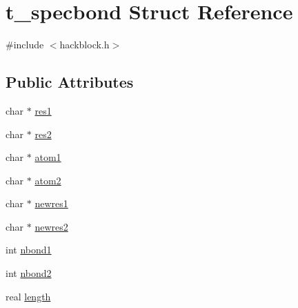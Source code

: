 \hypertarget{structt__specbond}{\section{t\-\_\-specbond \-Struct \-Reference}
\label{structt__specbond}
}


{\ttfamily \#include $<$hackblock.\-h$>$}

\subsection*{\-Public \-Attributes}
\begin{DoxyCompactItemize}
\item 
char $\ast$ \hyperlink{structt__specbond_a2f4282a04a0e3f8f659256346d3a988b}{res1}
\item 
char $\ast$ \hyperlink{structt__specbond_a9c34c71a63b58ce3d4e1d528c7e20a4a}{res2}
\item 
char $\ast$ \hyperlink{structt__specbond_a651d67f7df69464dc46316e87f7dbf9b}{atom1}
\item 
char $\ast$ \hyperlink{structt__specbond_a0acc53a3a1bc5018d6adfd46b2e2dbc5}{atom2}
\item 
char $\ast$ \hyperlink{structt__specbond_abddca48c89c038ceab7f978da8d16e02}{newres1}
\item 
char $\ast$ \hyperlink{structt__specbond_a1377197019ff7ce02c4148d9a916742e}{newres2}
\item 
int \hyperlink{structt__specbond_ac708649e74b4ed4b51bd63da19a48a42}{nbond1}
\item 
int \hyperlink{structt__specbond_a62c5af0887c787a58821cb3e0e7e2494}{nbond2}
\item 
real \hyperlink{structt__specbond_ac9d041ccc3e3019089bb4a2daae7d73d}{length}
\end{DoxyCompactItemize}



